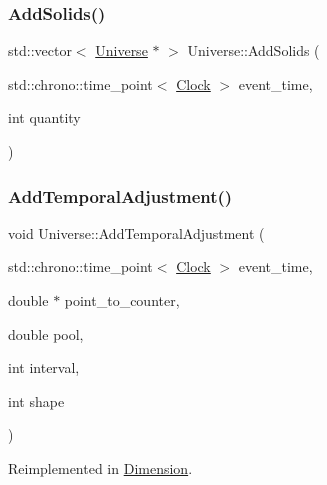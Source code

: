 \mbox{\label{classUniverse_a410d5ba2224fe90584b1f1aa5b38b41c}} 
\subsubsection{\texorpdfstring{Add\+Solids()}{AddSolids()}}
{\footnotesize\ttfamily std\+::vector$<$ \mbox{\hyperlink{classUniverse}{Universe}} $\ast$ $>$ Universe\+::\+Add\+Solids (\begin{DoxyParamCaption}\item[{std\+::chrono\+::time\+\_\+point$<$ \mbox{\hyperlink{universe_8h_a0ef8d951d1ca5ab3cfaf7ab4c7a6fd80}{Clock}} $>$}]{event\+\_\+time,  }\item[{int}]{quantity }\end{DoxyParamCaption})}

\mbox{\label{classUniverse_a901e16db5e8af258c66af7ac75662fe0}} 
\subsubsection{\texorpdfstring{Add\+Temporal\+Adjustment()}{AddTemporalAdjustment()}}
{\footnotesize\ttfamily void Universe\+::\+Add\+Temporal\+Adjustment (\begin{DoxyParamCaption}\item[{std\+::chrono\+::time\+\_\+point$<$ \mbox{\hyperlink{universe_8h_a0ef8d951d1ca5ab3cfaf7ab4c7a6fd80}{Clock}} $>$}]{event\+\_\+time,  }\item[{double $\ast$}]{point\+\_\+to\+\_\+counter,  }\item[{double}]{pool,  }\item[{int}]{interval,  }\item[{int}]{shape }\end{DoxyParamCaption})\hspace{0.3cm}{\ttfamily [virtual]}}



Reimplemented in \mbox{\hyperlink{classDimension_a278d8c3df7896eb01c55283482f8674a}{Dimension}}.

\mbox{\label{classUniverse_a15aa20218286fd11ecb9b792dfb63be3}} 
